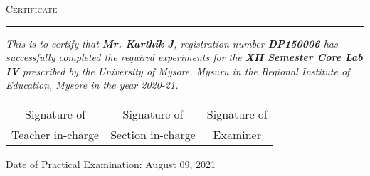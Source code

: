 \documentclass[12pt]{book}
\begin{document}
\begin{titlepage}
	\selectfont
	\vspace*{\fill}
	\begin{tcolorbox}[title=Regional Institute of Education Mysore]
		\begin{center}
			\vspace{20pt}
			{\Huge\textsc{Certificate}}\\
			\vspace{10pt}
			\hrule
			\vspace{50pt}
			
			\vfill
			\large
			\justify
				\qquad\emph{This is to certify that \textbf{Mr. Karthik J}, registration number \textbf{DP150006} has successfully completed the required experiments for the \textbf{XII Semester Core Lab IV} prescribed by the University of Mysore, Mysuru in the Regional Institute of Education, Mysore in the year 2020-21.}
			\vspace{3cm}
		\end{center}
	\begin{center}
		\small
			\begin{tabular}{c@{\hskip 0.6in}c@{\hskip 0.6in}c}
			Signature of&Signature of&Signature of\\Teacher in-charge&
			Section in-charge&Examiner
		\end{tabular}
	\end{center}
	\vspace{1cm}
		Date of Practical Examination: August 09, 2021
	\end{tcolorbox}
\vspace*{\fill}
\end{titlepage}


\newcommand{\dateofexp}[1]{%
	\addtocontents{toc}{\medskip\noindent\detokenize{#1}\leavevmode\par\medskip}
}

\tableofcontents
\clearpage


\newpage
%
%

\newpage
%

\newpage
%

\newpage
%

\newpage
%
%

%
\newpage

\newpage

\newpage

\end{document}
